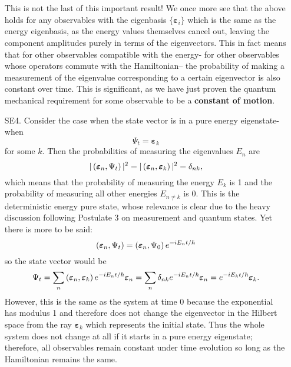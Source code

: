 \begin{enumerate}
    \\\\
    This is not the last of this important result! We once more see that the above holds for any observables with the eigenbasis $\{\bm{\varepsilon}_{i}\}$ which is the same as the energy eigenbasis, as the energy values themselves cancel out, leaving the component amplitudes purely in terms of the eigenvectors. This in fact means that for other observables compatible with the energy- for other observables whose operators commute with the Hamiltonian-- the probability of making a measurement of the eigenvalue corresponding to a certain eigenvector is also constant over time. This is significant, as we have just proven the quantum mechanical requirement for some observable to be a \textbf{constant of motion}.
    \item[SE4.] Consider the case when the state vector is in a pure energy eigenstate- when 
    $$
    \Psi_{t}=\bm{\varepsilon}_{k}
    $$
    for some $k$. Then the probabilities of measuring the eigenvalues $E_{n}$ are 
    $$
    |\left(\bm{\varepsilon}_{n},\Psi_{t}\right)|^{2}=|\left(\bm{\varepsilon}_{n},\bm{\varepsilon}_{k}\right)|^{2}=\delta_{nk},
    $$
    which means that the probability of measuring the energy $E_{k}$ is 1 and the probability of measuring all other energies $E_{n\neq k}$ is 0. This is the deterministic energy pure state, whose relevance is clear due to the heavy discussion following Postulate 3 on measurement and quantum states. Yet there is more to be said:
    $$
   \left(\bm{\varepsilon}_{n},\Psi_{t}\right)=\left(\bm{\varepsilon}_{n},\Psi_{0}\right)e^{-{iE_{n}t}/{\hbar}}
    $$
    so the state vector would be
    $$
    \Psi_{t}=\sum_{n}\left(\bm{\varepsilon}_{n},\bm{\varepsilon}_{k}\right)e^{-{iE_{n}t}/{\hbar}}\bm{\varepsilon}_{n}=\sum_{n}\delta_{nk}e^{-{iE_{n}t}/{\hbar}}\bm{\varepsilon}_{n}=e^{-{iE_{k}t}/{\hbar}}\bm{\varepsilon}_{k}.
    $$
    However, this is the same as the system at time $0$ because the exponential has modulus 1 and therefore does not change the eigenvector in the Hilbert space from the ray
    $\bm{\varepsilon}_{k}$ which represents the initial state. Thus the whole system does not change at all if it starts in a pure energy eigenstate; therefore, all observables remain constant under time evolution so long as the Hamiltonian remains the same.
    \\\\

\end{enumerate}
